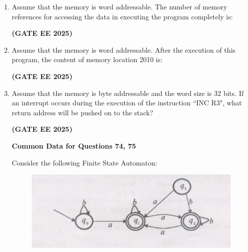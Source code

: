 \documentclass[journal,12pt,onecolumn]{IEEEtran}
\theoremstyle{remark}
\begin{document}
\begin{enumerate}
    
        \item  Assume that the memory is word addressable. The number of memory references for accessing the data in executing the program completely is:
        \begin{enumerate}
        \end{enumerate}
\hfill \textbf{(GATE EE 2025)}
        \item Assume that the memory is word addressable. After the execution of this program, the content of memory location 2010 is:
        \begin{enumerate}
        \end{enumerate}
\hfill \textbf{(GATE EE 2025)}
        \item Assume that the memory is byte addressable and the word size is 32 bits. If an interrupt occurs during the execution of the instruction ``INC R3", what return address will be pushed on to the stack?
        \begin{enumerate}
        \end{enumerate}
\hfill \textbf{(GATE EE 2025)}
 
\textbf{Common Data for Questions 74, 75}

Consider the following Finite State Automaton:
\begin{figure}[h]
    \centering
    \includegraphics[width=0.5\linewidth]{figs/fig4.png}
    \caption{   }
    \label{fig4}
\end{figure}


\end{enumerate}
\end{document}
